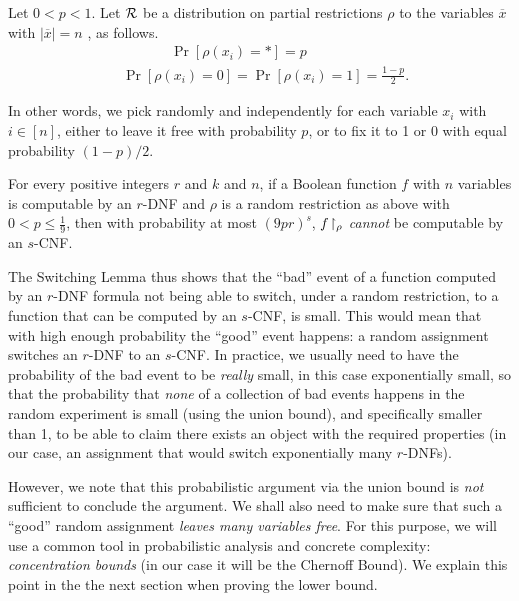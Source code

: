 \begin{tcolorbox}[colframe=white, colback=green!6, boxrule=0mm, sharp corners]
\begin{definition}\label{def:random-rest}
 Let $0< p<1$.
Let $\mathcal{R}$ be a distribution on partial restrictions $\rho$ to the variables $\overline{x}$ with $|\overline{x}|=n$ , as follows.
$$
\begin{aligned}
& ~~~~~~~~~~~ \quad \operatorname{Pr}\left[\rho\left(x_i\right)=*\right]=p \\
& \operatorname{Pr}\left[\rho\left(x_i\right)=0\right]=\operatorname{Pr}\left[\rho\left(x_i\right)=1\right]=\frac{1-p}{2}.
\end{aligned}
$$
\end{definition}
\end{tcolorbox}
In other words, we pick randomly and independently for each variable $x_i$ with $i\in[n]$, either to leave it free with probability $p$, or to fix it to 1 or 0 with equal probability $(1-p)/2$.


\begin{tcolorbox}[colframe=white, colback=blue!5, boxrule=0mm, sharp corners]
\begin{theorem}\label{thm:Switching-Lemma}
For every positive integers $r$ and $k$ and $n$, if a Boolean function $f$ with $n$ variables is computable by an $r$-DNF and $\rho$ is a random restriction as above with $0<p \leq \frac{1}{9}$, then with probability at most $(9pr)^s$, $f\!\upharpoonright_\rho$ \emph{cannot} be computable by  an $s$-CNF.
\end{theorem}
\end{tcolorbox}

The Switching Lemma thus shows that the ``bad'' event of a function computed by an $r$-DNF formula not being able to switch, under  a random restriction,  to a function that can be computed by an $s$-CNF, is small. This would mean that with high enough probability the ``good'' event happens: a random assignment switches an $r$-DNF to an $s$-CNF.
In practice, we usually need to have the probability of the bad event to be \emph{really} small, in this case  exponentially small, so that the probability that \emph{none} of a collection of bad events happens in the random experiment is small (using the union bound), and specifically smaller than 1, to be able to claim there exists an object with the required properties (in our case, an assignment that would switch exponentially many $r$-DNFs).  

However, we note that this probabilistic argument via the union bound  is  \emph{not} sufficient to conclude the argument. We shall also need to make sure that such a ``good'' random assignment  \emph{leaves many variables free}. For this purpose, we will use a common tool in probabilistic analysis and concrete complexity: \emph{concentration bounds} (in our case it will be the Chernoff Bound). We  explain this point in the the next section when proving the lower bound.


